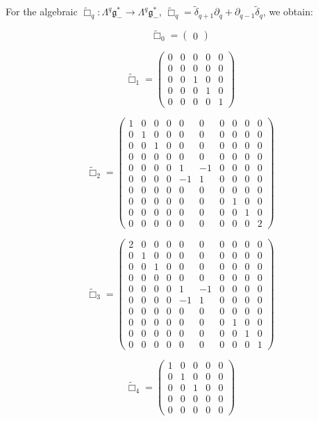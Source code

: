 \documentclass[reqno,12pt]{amsart}
\newcommand\goe{\mathfrak g}
\theoremstyle{plain}
\theoremstyle{definition}
\begin{document}
For the algebraic $\tilde\Box_q\colon\Lambda^q\goe^*_-\to\Lambda^q\goe^*_-$, $\tilde\Box_q=\tilde\delta_{q+1}\partial_q+\partial_{q-1}\tilde\delta_q$, we obtain:

$$
\tilde\Box_0=\left(\begin{array}{c}
0
\end{array}\right)
$$

$$
\tilde\Box_1=\left(\begin{array}{cc|c|cc}
0&0&0&0&0\\
0&0&0&0&0\\
\hline
0&0&1&0&0\\
\hline
0&0&0&1&0\\
0&0&0&0&1
\end{array}\right)
$$

$$
\tilde\Box_2=\left(\begin{array}{c|cc|cccc|cc|c}
1&0&0&0&0& 0& 0&0&0&0\\
\hline
0&1&0&0&0& 0& 0&0&0&0\\
0&0&1&0&0& 0& 0&0&0&0\\
\hline
0&0&0&0&0& 0& 0&0&0&0\\
0&0&0&0&1& -1&0&0&0&0\\
0&0&0&0&-1&1& 0&0&0&0\\
0&0&0&0&0& 0& 0&0&0&0\\
\hline
0&0&0&0&0& 0& 0&1&0&0\\
0&0&0&0&0& 0& 0&0&1&0\\
\hline
0&0&0&0&0& 0& 0&0&0&2
\end{array}\right)
$$

$$
\tilde\Box_3=\left(\begin{array}{c|cc|cccc|cc|c}
2&0&0&0&0& 0& 0&0&0&0\\
\hline
0&1&0&0&0& 0& 0&0&0&0\\
0&0&1&0&0& 0& 0&0&0&0\\
\hline
0&0&0&0&0& 0& 0&0&0&0\\
0&0&0&0&1& -1&0&0&0&0\\
0&0&0&0&-1&1& 0&0&0&0\\
0&0&0&0&0& 0& 0&0&0&0\\
\hline
0&0&0&0&0& 0& 0&1&0&0\\
0&0&0&0&0& 0& 0&0&1&0\\
\hline
0&0&0&0&0& 0& 0&0&0&1
\end{array}\right)
$$

$$
\tilde\Box_4=\left(\begin{array}{cc|c|cc}
1&0&0&0&0\\
0&1&0&0&0\\
\hline
0&0&1&0&0\\
\hline
0&0&0&0&0\\
0&0&0&0&0
\end{array}\right)
$$
\end{document}
